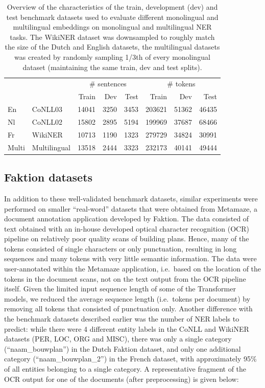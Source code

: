 \documentclass[12pt,a4paper,]{book}
\begin{document}
\begin{table}

\caption{\label{tab:benchmark-ds}Overview of the characteristics of the train, development (dev) and test benchmark datasets used to evaluate different monolingual and multilingual embeddings on monolingual and multilingual NER tasks. The WikiNER dataset was downsampled to roughly match the size of the Dutch and English datasets, the multilingual datasets was created by randomly sampling 1/3th of every monolingual dataset (maintaining the same train, dev and test splits).}
\centering
\begin{tabular}[t]{llrrrrrr}
\toprule
\multicolumn{2}{c}{ } & \multicolumn{3}{c}{\# sentences} & \multicolumn{3}{c}{\# tokens} \\
\cmidrule(l{3pt}r{3pt}){3-5} \cmidrule(l{3pt}r{3pt}){6-8}
 &  & Train & Dev & Test & Train & Dev & Test\\
\midrule
En & CoNLL03 & 14041 & 3250 & 3453 & 203621 & 51362 & 46435\\
Nl & CoNLL02 & 15802 & 2895 & 5194 & 199969 & 37687 & 68466\\
Fr & WikiNER & 10713 & 1190 & 1323 & 279729 & 34824 & 30991\\
Multi & Multilingual & 13518 & 2444 & 3323 & 232173 & 40141 & 49444\\
\bottomrule
\end{tabular}
\end{table}

\hypertarget{faktion-datasets}{%
\subsection{Faktion datasets}\label{faktion-datasets}}

In addition to these well-validated benchmark datasets, similar experiments were performed on smaller ``real-word'' datasets that were obtained from Metamaze, a document annotation application developed by Faktion. The data consisted of text obtained with an in-house developed optical character recognition (OCR) pipeline on relatively poor quality scans of building plans. Hence, many of the tokens consisted of single characters or only punctuation, resulting in long sequences and many tokens with very little semantic information. The data were user-annotated within the Metamaze application, i.e.~based on the location of the tokens in the document scans, not on the text output from the OCR pipeline itself. Given the limited input sequence length of some of the Transformer models, we reduced the average sequence length (i.e.~tokens per document) by removing all tokens that consisted of punctuation only. Another difference with the benchmark datasets described earlier was the number of NER labels to predict: while there were 4 different entity labels in the CoNLL and WikiNER datasets (PER, LOC, ORG and MISC), there was only a single category (``naam\_bouwplan'') in the Dutch Faktion dataset, and only one additional category (``naam\_bouwplan\_2'') in the French dataset, with approximately 95\% of all entities belonging to a single category. A representative fragment of the OCR output for one of the documents (after preprocessing) is given below:
\end{document}
